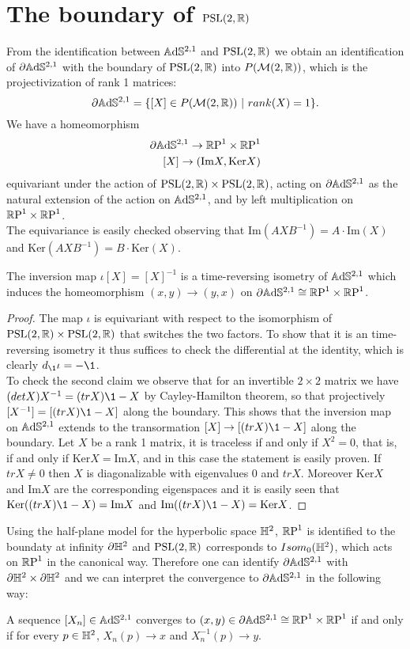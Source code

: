 \section{The boundary of $\PSL$}
From the identification between $\A^{2,1}$ and $\PSL$ we obtain an identification of $\partial \A^{2,1}$ with the boundary of $\PSL$ into $P(\mathcal{M}(2,\R))$, which is the projectivization of rank 1 matrices:
\[
    \partial \A^{2,1} = \{ [X] \in P(\mathcal{M}(2,\R)) \ | \ rank(X)=1 \}.
\]
We have a homeomorphism
\begin{align}
    \partial \A^{2,1} \to \T \\
    [X] \to (\text{Im}X, \text{Ker}X)
\end{align}
equivariant under the action of $\PSL \times \PSL$, acting on $\partial\A^{2,1}$ as the natural extension of the action on $\A^{2,1}$, and by left multiplication on $\T$.\\
The equivariance is easily checked observing that $\text{Im}(AXB^{-1}) = A \cdot \text{Im}(X)$ and $\text{Ker}(AXB^{-1}) = B \cdot \text{Ker}(X)$.
\begin{lemma}
    The inversion map $\iota [X] = [X]^{-1}$ is a time-reversing isometry of $\A^{2,1}$ which induces the homeomorphism $(x,y) \to (y,x)$ on $\partial \A^{2,1} \cong \T$.
\end{lemma}
\begin{proof}
    The map $\iota$ is equivariant with respect to the isomorphism of $\PSL \times \PSL$ that switches the two factors.
    To show that it is an time-reversing isometry it thus suffices to check the differential at the identity, which is clearly $d_\1 \iota = -\1$.\\
    To check the second claim we observe that for an invertible $2 \times 2$ matrix we have $(detX)X^{-1} = (trX)\1 - X$ by Cayley-Hamilton theorem, so that projectively $[X^{-1}]=[(trX) \1 - X]$ along the boundary.
    This shows that the inversion map on $\A^{2,1}$ extends to the transormation $[X] \to [(trX)\1 - X]$ along the boundary.
    Let $X$ be a rank 1 matrix, it is traceless if and only if $X^2 =0$, that is, if and only if $\text{Ker}X=\text{Im}X$, and in this case the statement is easily proven.
    If $trX \neq 0$ then $X$ is diagonalizable with eigenvalues $0$ and $trX$. Moreover $\text{Ker}X$ and $\text{Im}X$ are the corresponding eigenspaces and it is easily seen that $\text{Ker}((trX)\1 -X) = \text{Im}X$ and $\text{Im}((trX)\1 -X) = \text{Ker}X$.
\end{proof}

Using the half-plane model for the hyperbolic space $\H^2$, $\S$ is identified to the boundaty at infinity $\partial \H^2$ and $\PSL$ corresponds to $Isom_0(\H^2)$, which acts on $\S$ in the canonical way.
Therefore one can identify $\partial \A^{2,1}$ with $\partial \H^2 \times \partial \H^2$ and we can interpret the convergence to $\partial \A^{2,1}$ in the following way:\\
\begin{lemma}
    A sequence $[X_n] \in \A^{2,1}$ converges to $(x,y) \in \partial \A^{2,1} \cong \T$ if and only if for every $p\in\H^2$, $X_n(p) \to x$ and $X_n^{-1}(p) \to y$.
\end{lemma}

